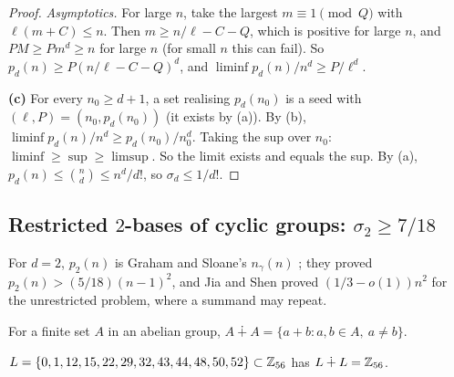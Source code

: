 \documentclass[11pt]{article}
\begin{document}
\begin{proof}
\emph{Asymptotics.} For large $n$, take the largest $m \equiv 1 \pmod{Q}$ with
$\ell(m + C) \le n$. Then $m \ge n/\ell - C - Q$, which is positive for large $n$, and
$PM \ge P m^d \ge n$ for large $n$ (for small $n$ this can fail). So
$p_d(n) \ge P(n/\ell - C - Q)^d$, and $\liminf p_d(n)/n^d \ge P/\ell^d$.

\medskip
\textbf{(c)} For every $n_0 \ge d+1$, a set realising $p_d(n_0)$ is a seed with
$(\ell, P) = (n_0, p_d(n_0))$ (it exists by (a)). By (b),
$\liminf p_d(n)/n^d \ge p_d(n_0)/n_0^d$. Taking the sup over $n_0$:
$\liminf \ge \sup \ge \limsup$. So the limit exists and equals the sup. By (a),
$p_d(n) \le \binom{n}{d} \le n^d/d!$, so $\sigma_d \le 1/d!$.
\end{proof}

\subsection{\texorpdfstring{Restricted $2$-bases of cyclic groups: $\sigma_2 \ge 7/18$}{Restricted 2-bases of cyclic groups: sigma\_2 >= 7/18}}\label{sec:B-sigma2}

For $d=2$, $p_2(n)$ is Graham and Sloane's $n_\gamma(n)$ \cite{GS}; they proved
$p_2(n)>(5/18)(n-1)^2$, and Jia and Shen \cite{JS} proved $(1/3-o(1))n^2$ for the unrestricted problem,
where a summand may repeat.

For a finite set $A$ in an abelian group, $A \dotplus A = \{a + b : a, b \in A,\ a \ne b\}$.

\begin{lemma}\label{lem:B-seed}
$L = \{0, 1, 12, 15, 22, 29, 32, 43, 44, 48, 50, 52\} \subset \mathbb{Z}_{56}$ has $L \dotplus L = \mathbb{Z}_{56}$.
\end{lemma}
\end{document}
